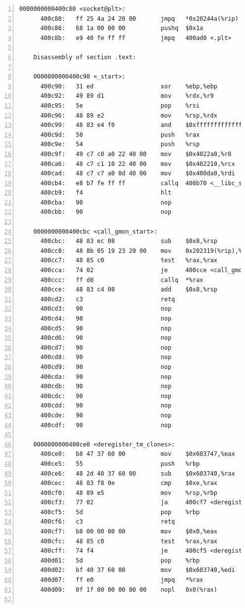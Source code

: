 \documentclass{article}
\begin{document}
\begin{lstlisting}[title = bomb的反汇编代码及部分注释, xleftmargin = 2em,xrightmargin = 2em, aboveskip = 1em, numbers = left, basicstyle=\scriptsize\ttfamily, numberstyle=\scriptsize]
    0000000000400c80 <socket@plt>:
      400c80:	ff 25 4a 24 20 00    	jmpq   *0x20244a(%rip)        # 6030d0 <socket@GLIBC_2.2.5>
      400c86:	68 1a 00 00 00       	pushq  $0x1a
      400c8b:	e9 40 fe ff ff       	jmpq   400ad0 <.plt>
    
    Disassembly of section .text:
    
    0000000000400c90 <_start>:
      400c90:	31 ed                	xor    %ebp,%ebp
      400c92:	49 89 d1             	mov    %rdx,%r9
      400c95:	5e                   	pop    %rsi
      400c96:	48 89 e2             	mov    %rsp,%rdx
      400c99:	48 83 e4 f0          	and    $0xfffffffffffffff0,%rsp
      400c9d:	50                   	push   %rax
      400c9e:	54                   	push   %rsp
      400c9f:	49 c7 c0 a0 22 40 00 	mov    $0x4022a0,%r8
      400ca6:	48 c7 c1 10 22 40 00 	mov    $0x402210,%rcx
      400cad:	48 c7 c7 a0 0d 40 00 	mov    $0x400da0,%rdi
      400cb4:	e8 b7 fe ff ff       	callq  400b70 <__libc_start_main@plt>
      400cb9:	f4                   	hlt    
      400cba:	90                   	nop
      400cbb:	90                   	nop
    
    0000000000400cbc <call_gmon_start>:
      400cbc:	48 83 ec 08          	sub    $0x8,%rsp
      400cc0:	48 8b 05 19 23 20 00 	mov    0x202319(%rip),%rax        # 602fe0 <__gmon_start__>
      400cc7:	48 85 c0             	test   %rax,%rax
      400cca:	74 02                	je     400cce <call_gmon_start+0x12>
      400ccc:	ff d0                	callq  *%rax
      400cce:	48 83 c4 08          	add    $0x8,%rsp
      400cd2:	c3                   	retq   
      400cd3:	90                   	nop
      400cd4:	90                   	nop
      400cd5:	90                   	nop
      400cd6:	90                   	nop
      400cd7:	90                   	nop
      400cd8:	90                   	nop
      400cd9:	90                   	nop
      400cda:	90                   	nop
      400cdb:	90                   	nop
      400cdc:	90                   	nop
      400cdd:	90                   	nop
      400cde:	90                   	nop
      400cdf:	90                   	nop
    
    0000000000400ce0 <deregister_tm_clones>:
      400ce0:	b8 47 37 60 00       	mov    $0x603747,%eax
      400ce5:	55                   	push   %rbp
      400ce6:	48 2d 40 37 60 00    	sub    $0x603740,%rax
      400cec:	48 83 f8 0e          	cmp    $0xe,%rax
      400cf0:	48 89 e5             	mov    %rsp,%rbp
      400cf3:	77 02                	ja     400cf7 <deregister_tm_clones+0x17>
      400cf5:	5d                   	pop    %rbp
      400cf6:	c3                   	retq   
      400cf7:	b8 00 00 00 00       	mov    $0x0,%eax
      400cfc:	48 85 c0             	test   %rax,%rax
      400cff:	74 f4                	je     400cf5 <deregister_tm_clones+0x15>
      400d01:	5d                   	pop    %rbp
      400d02:	bf 40 37 60 00       	mov    $0x603740,%edi
      400d07:	ff e0                	jmpq   *%rax
      400d09:	0f 1f 80 00 00 00 00 	nopl   0x0(%rax)
    

\end{lstlisting}
\end{document}
